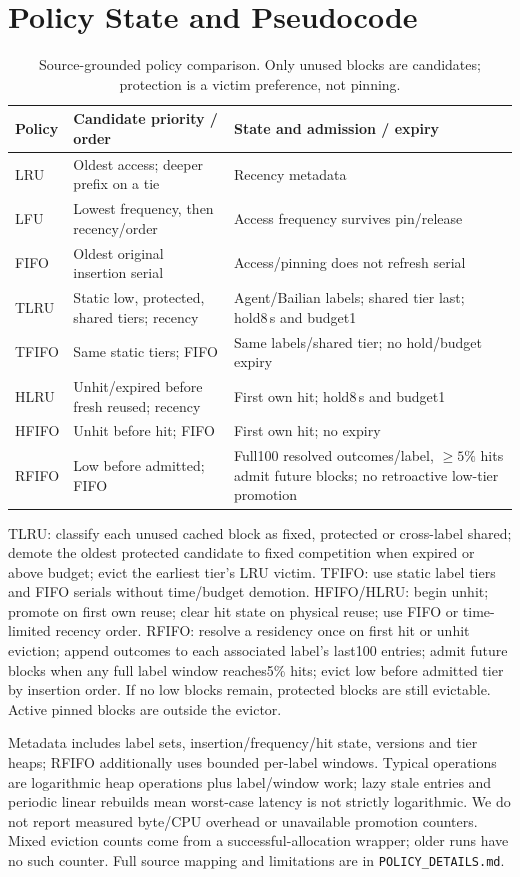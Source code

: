 \documentclass{article}
\begin{document}
\section{Policy State and Pseudocode}
\begin{table}[t]\centering\small
\caption{Source-grounded policy comparison. Only unused blocks are candidates; protection is a victim preference, not pinning.}
\begin{tabular}{lp{}p{}}\toprule
Policy & Candidate priority / order & State and admission / expiry\\\midrule
LRU & Oldest access; deeper prefix on a tie & Recency metadata\\
LFU & Lowest frequency, then recency/order & Access frequency survives pin/release\\
FIFO & Oldest original insertion serial & Access/pinning does not refresh serial\\
TLRU & Static low, protected, shared tiers; recency & Agent/Bailian labels; shared tier last; hold8\,s and budget1\\
TFIFO & Same static tiers; FIFO & Same labels/shared tier; no hold/budget expiry\\
HLRU & Unhit/expired before fresh reused; recency & First own hit; hold8\,s and budget1\\
HFIFO & Unhit before hit; FIFO & First own hit; no expiry\\
RFIFO & Low before admitted; FIFO & Full100 resolved outcomes/label, $\ge5\%$ hits admit future blocks; no retroactive low-tier promotion\\\bottomrule
\end{tabular}\end{table}
TLRU: classify each unused cached block as fixed, protected or cross-label shared; demote the oldest protected candidate to fixed competition when expired or above budget; evict the earliest tier's LRU victim. TFIFO: use static label tiers and FIFO serials without time/budget demotion. HFIFO/HLRU: begin unhit; promote on first own reuse; clear hit state on physical reuse; use FIFO or time-limited recency order. RFIFO: resolve a residency once on first hit or unhit eviction; append outcomes to each associated label's last100 entries; admit future blocks when any full label window reaches5\% hits; evict low before admitted tier by insertion order. If no low blocks remain, protected blocks are still evictable. Active pinned blocks are outside the evictor.

Metadata includes label sets, insertion/frequency/hit state, versions and tier heaps; RFIFO additionally uses bounded per-label windows. Typical operations are logarithmic heap operations plus label/window work; lazy stale entries and periodic linear rebuilds mean worst-case latency is not strictly logarithmic. We do not report measured byte/CPU overhead or unavailable promotion counters. Mixed eviction counts come from a successful-allocation wrapper; older runs have no such counter. Full source mapping and limitations are in \texttt{POLICY\_DETAILS.md}.
\end{document}
